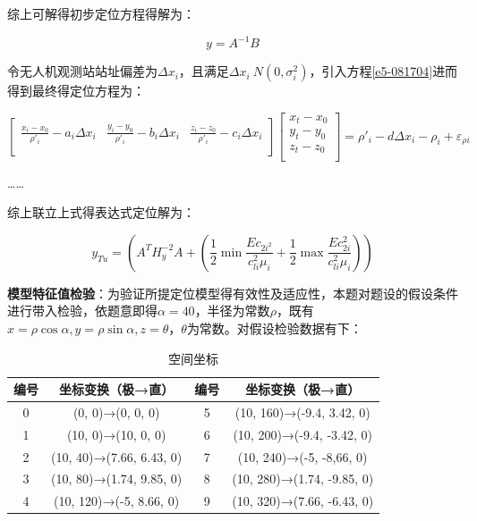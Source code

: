 综上可解得初步定位方程得解为：

\begin{equation}
    y=A^{-1}B
\end{equation}

令无人机观测站站址偏差为$\Delta x_i$，且满足$\Delta x_i~N(0,\sigma_i^2)$，引入方程\eqref{e5-081704}进而得到最终得定位方程为：

\begin{equation}
\left[
    \begin{matrix}
        \frac{x_i-x_0}{\rho'_i} - a_i\Delta x_i     &   \frac{y_i-y_0}{\rho'_i} - b_i\Delta x_i     &   \frac{z_i-z_0}{\rho'_i} - c_i\Delta x_i \\
    \end{matrix}
\right]
\left[
    \begin{matrix}
        x_t - x_0   \\
        y_t - y_0   \\
        z_t - z_0   \\
    \end{matrix}
\right]
=
\rho'_i - d\Delta x_i - \rho_i + \varepsilon_{\rho i}
\end{equation}

……

综上联立上式得表达式定位解为：

\begin{equation}
    y_{Tu}=
    \left (
        A^TH_y^{-2}A
        +
        \left (
            \frac{1}{2}\min\frac{E{c_{2i^2}}}{c_{li}^2\mu_i} +
            \frac{1}{2}\max\frac{E{c_{2i}^2}}{c_{li}^2\mu_i}
        \right )
    \right )
\end{equation}

\textbf{模型特征值检验}：为验证所提定位模型得有效性及适应性，本题对题设的假设条件进行带入检验，依题意即得$\alpha=40$，半径为常数$\rho$，既有$x=\rho\cos\alpha, y=\rho\sin\alpha,z=\theta$，$\theta$为常数。对假设检验数据有下：

\begin{table}[htp!]
    \centering
    \caption{空间坐标}
    \begin{tabular}{cccc}
        \hline
        编号&   坐标变换（极→直）&   编号&   坐标变换（极→直）  \\
        \hline

        0&  (0, 0)→(0, 0, 0)&  5& (10, 160)→(-9.4, 3.42, 0)   \\
        1&  (10, 0)→(10, 0, 0)&    6&  (10, 200)→(-9.4, -3.42, 0)    \\
        2& (10, 40)→(7.66, 6.43, 0)&    7&  (10, 240)→(-5, -8,66, 0)    \\
        3& (10, 80)→(1.74, 9.85, 0)&   8&  (10, 280)→(1.74, -9.85, 0)  \\
        4&  (10, 120)→(-5, 8.66, 0)&    9&  (10, 320)→(7.66, -6.43, 0)  \\

        \hline
    \end{tabular}
\end{table}

